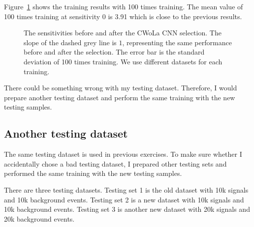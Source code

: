 \documentclass[12pt]{article}
\begin{document}
		Figure~\ref{fig:sensitivity_improvement_100_random_seed} shows the training results with 100 times training. The mean value of 100 times training at sensitivity 0 is 3.91 which is close to the previous results.
        \begin{figure}[htpb]
            \centering
            \caption{The sensitivities before and after the CWoLa CNN selection. The slope of the dashed grey line is $1$, representing the same performance before and after the selection. The error bar is the standard deviation of 100 times training. We use different datasets for each training.}
            \label{fig:sensitivity_improvement_100_random_seed}
        \end{figure}

		There could be something wrong with my testing dataset. Therefore, I would prepare another testing dataset and perform the same training with the new testing samples.
    \subsection{Another testing dataset}%
    \label{sub:another_testing_dataset}
        The same testing dataset is used in previous exercises. To make sure whether I accidentally chose a bad testing dataset, I prepared other testing sets and performed the same training with the new testing samples.

		There are three testing datasets. Testing set 1 is the old dataset with 10k signals and 10k background events. Testing set 2 is a new dataset with 10k signals and 10k background events. Testing set 3 is another new dataset with 20k signals and 20k background events.
\end{document}
